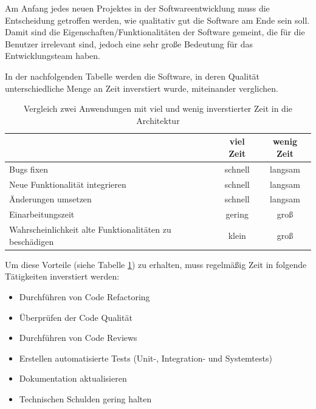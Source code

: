 

    Am Anfang jedes neuen Projektes in der Softwareentwicklung muss die Entscheidung getroffen werden, wie qualitativ gut die Software am Ende sein soll.
    Damit sind die Eigenschaften/Funktionalitäten der Software gemeint, die für die Benutzer irrelevant sind, jedoch eine sehr große Bedeutung 
    für das Entwicklungsteam haben.
    
    In der nachfolgenden Tabelle werden die Software, 
    in deren Qualität unterschiedliche Menge an Zeit inverstiert wurde, miteinander verglichen.

    \begin{table}[h!]
        \centering
    \begin{tabular}{ |l|c|c| } 
        \hline
                                                                & viel Zeit & wenig Zeit \\ 
                                                                \hline
        Bugs fixen                                              & schnell       & langsam \\ 
        Neue Funktionalität integrieren                         & schnell       & langsam \\
        Änderungen umsetzen                                     & schnell       & langsam \\ 
        Einarbeitungszeit                                       & gering        & groß \\
        Wahrscheinlichkeit alte Funktionalitäten zu beschädigen & klein       & groß \\
        \hline

       \end{tabular}
       \caption{Vergleich zwei Anwendungen mit viel und wenig inverstierter Zeit in die Architektur}
       \label{tab:compareGoodAndBadArchitecture}
    \end{table}

    Um diese Vorteile (siehe Tabelle \ref{tab:compareGoodAndBadArchitecture}) zu erhalten, muss regelmäßig Zeit in folgende Tätigkeiten inverstiert werden:
    \begin{itemize}
        \item Durchführen von Code Refactoring
        \item Überprüfen der Code Qualität
        \item Durchführen von Code Reviews
        \item Erstellen automatisierte Tests (Unit-, Integration- und Systemtests)
        \item Dokumentation aktualisieren
        \item Technischen Schulden gering halten
    \end{itemize}

